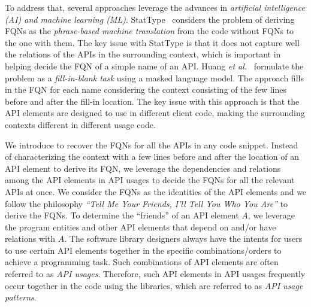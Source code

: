 To address that, several approaches leverage the advances in {\em
  artificial intelligence (AI) and machine learning
  (ML)}. StatType~\cite{icse18} considers the problem of deriving FQNs
as the {\em phrase-based machine translation} from the code without
FQNs to the one with them. The key issue with StatType is that it does
not capture well the relations of the APIs in the surrounding context,
which is important in helping decide the FQN of a simple name of an
API. Huang {\em et al.}~\cite{prompt-ase22} formulate the problem as a
{\em fill-in-blank task} using a masked language model. The approach
fills in the FQN for each name considering the context consisting of
the few lines before and after the fill-in location. The key issue
with this approach is that the API elements are designed to use in
different client code, making the surrounding contexts different in
different usage code.

We introduce {\tool} to recover the FQNs for all the APIs in any code
snippet. Instead of characterizing the context with a few lines before
and after the location of an API element to derive its FQN, we
leverage the dependencies and relations among the API elements in API
usages to decide the FQNs for all the relevant APIs at once. We
consider the FQNs as the identities of the API elements and we follow
the philosophy {\em ``Tell Me Your Friends, I'll Tell You Who You
  Are''} to derive the FQNs. To determine the ``friends'' of an API
element $A$, we leverage the program entities and other API elements
that depend on and/or have relations with $A$. The software library
designers always have the intents for users to use certain API
elements together in the specific combinations/orders to achieve a
programming task. Such combinations of API elements are often
referred to as {\em API usages}. Therefore, such API elements in API
usages frequently occur together in the code using the libraries,
which are referred to as {\em API usage patterns}.

